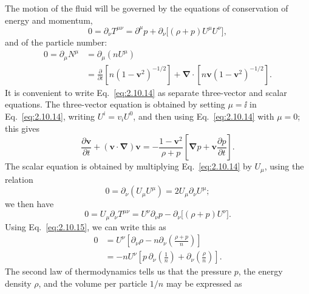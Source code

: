 The motion of the fluid will be governed by the equations of conservation of
energy and momentum,
\begin{equation}
  0=\partial_\nu T^{\mu\nu}
  =\partial^\mu p
   +\partial_\nu\bigl[(\rho+p)U^\mu U^\nu\bigr],
  \tag{2.10.14}\label{eq:2.10.14}
\end{equation}
and of the particle number:
\begin{equation}
\begin{aligned}
  0=\partial_\mu N^\mu
  &=\partial_\mu(nU^\mu)\\
  &=\frac{\partial}{\partial t}
    \left[n(1-\mathbf v^2)^{-1/2}\right]
   +\boldsymbol{\nabla}\cdot
    \left[n\mathbf v(1-\mathbf v^2)^{-1/2}\right].
\end{aligned}
  \tag{2.10.15}\label{eq:2.10.15}
\end{equation}
It is convenient to write Eq.~\eqref{eq:2.10.14} as separate three-vector and
scalar equations. The three-vector equation is obtained by setting \(\mu=\ii\)
in Eq.~\eqref{eq:2.10.14}, writing \(U^i=v_iU^0\), and then using
Eq.~\eqref{eq:2.10.14} with \(\mu=0\); this gives
\begin{equation}
  \frac{\partial\mathbf v}{\partial t}
  +(\mathbf v\cdot\boldsymbol{\nabla})\mathbf v
  =-\frac{1-\mathbf v^2}{\rho+p}
  \left[
    \boldsymbol{\nabla}p
    +\mathbf v\frac{\partial p}{\partial t}
  \right].
  \tag{2.10.16}\label{eq:2.10.16}
\end{equation}
The scalar equation is obtained by multiplying Eq.~\eqref{eq:2.10.14} by
\(U_\mu\), using the relation
\begin{equation}
  0=\partial_\nu(U_\mu U^\mu)
  =2U_\mu\partial_\nu U^\mu ;
  \tag{2.10.17}\label{eq:2.10.17}
\end{equation}
we then have
\[
  0=U_\mu\partial_\nu T^{\mu\nu}
  =U^\nu\partial_\nu p
   -\partial_\nu\bigl[(\rho+p)U^\nu\bigr].
\]
Using Eq.~\eqref{eq:2.10.15}, we can write this as
\begin{equation}
\begin{aligned}
  0
  &=U^\nu\left[
      \partial_\nu\rho
      -n\partial_\nu\left(\frac{\rho+p}{n}\right)
    \right]\\
  &=-nU^\nu\left[
      p\,\partial_\nu\left(\frac1n\right)
      +\partial_\nu\left(\frac{\rho}{n}\right)
    \right].
\end{aligned}
  \tag{2.10.17a}\label{eq:2.10.17a}
\end{equation}
The second law of thermodynamics tells us that the pressure \(p\), the energy
density \(\rho\), and the volume per particle \(1/n\) may be expressed as
